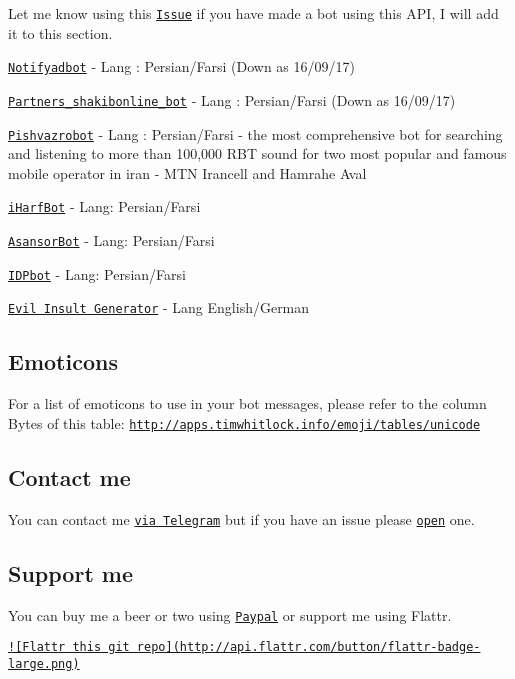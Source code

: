 Let me know using this \href{https://github.com/Eleirbag89/TelegramBotPHP/issues/80}{\tt Issue} if you have made a bot using this A\-P\-I, I will add it to this section.
\begin{DoxyItemize}
\item \href{https://telegram.me/notifyadbot}{\tt Notifyadbot} -\/ Lang \-: Persian/\-Farsi (Down as 16/09/17)
\item \href{https://telegram.me/Partners_shakibonline_bot}{\tt Partners\-\_\-shakibonline\-\_\-bot} -\/ Lang \-: Persian/\-Farsi (Down as 16/09/17)
\item \href{https://t.me/pishvazrobot}{\tt Pishvazrobot} -\/ Lang \-: Persian/\-Farsi -\/ the most comprehensive bot for searching and listening to more than 100,000 R\-B\-T sound for two most popular and famous mobile operator in iran -\/ M\-T\-N Irancell and Hamrahe Aval
\item \href{https://t.me/iHarfBot}{\tt i\-Harf\-Bot} -\/ Lang\-: Persian/\-Farsi
\item \href{https://t.me/AsansorBot}{\tt Asansor\-Bot} -\/ Lang\-: Persian/\-Farsi
\item \href{https://t.me/IDPbot}{\tt I\-D\-Pbot} -\/ Lang\-: Persian/\-Farsi
\item \href{https://telegram.me/EvilInsultGeneratorBot}{\tt Evil Insult Generator} -\/ Lang English/\-German
\end{DoxyItemize}

\subsection*{Emoticons }

For a list of emoticons to use in your bot messages, please refer to the column Bytes of this table\-: \href{http://apps.timwhitlock.info/emoji/tables/unicode}{\tt http\-://apps.\-timwhitlock.\-info/emoji/tables/unicode}

\subsection*{Contact me }

You can contact me \href{https://telegram.me/ggrillo}{\tt via Telegram} but if you have an issue please \href{https://github.com/Eleirbag89/TelegramBotPHP/issues}{\tt open} one.

\subsection*{Support me }

You can buy me a beer or two using \href{https://paypal.me/eleirbag89}{\tt Paypal} or support me using Flattr.

\href{https://flattr.com/submit/auto?user_id=eleirbag89&url=https://github.com/Eleirbag89/TelegramBotPHP&title=TelegramBotPHP&language=&tags=github&category=software}{\tt !\mbox{[}Flattr this git repo\mbox{]}(http\-://api.\-flattr.\-com/button/flattr-\/badge-\/large.\-png)} 